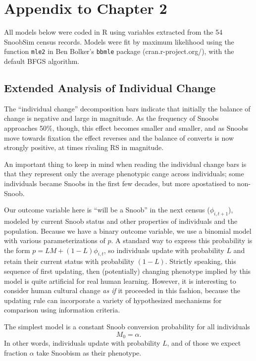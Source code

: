 \section{Appendix to Chapter 2}

All models below were coded in R using variables extracted from the 54 SnoobSim census records.  Models were fit by maximum likelihood using the function \texttt{mle2} in Ben Bolker's \texttt{bbmle} package (cran.r-project.org/), with the default BFGS algorithm.

\subsection{Extended Analysis of Individual Change}

The ``individual change'' decomposition bars indicate that initially the balance of change is negative and large in magnitude.  As the frequency of Snoobs approaches 50\%, though, this effect becomes smaller and smaller, and as Snoobs move towards fixation the effect reverses and the balance of converts is now strongly positive, at times rivaling RS in magnitude.

An important thing to keep in mind when reading the individual change bars is that they represent only the average phenotypic cange across individuals; some individuals became Snoobs in the first few decades, but more apostatised to non-Snoob.  

Our outcome variable here is ``will be a Snoob'' in the next census ($\phi_{i,t+1}$), modeled by current Snoob status and other properties of individuals and the population.  Because we have a binary outcome variable, we use a binomial model with various parameterizations of $p$.  A standard way to express this probability is the form $p = LM + (1-L)\phi_{i,t}$, so individuals update with probability $L$ and retain their current status with probability $(1-L)$.  Strictly speaking, this sequence of first updating, then (potentially) changing phenotype implied by this model is quite artificial for real human learning.  However, it is interesting to consider human cultural change \textit{as if} it proceeded in this fashion, because the updating rule can incorporate a variety of hypothesized mechanisms for comparison using information criteria. 

The simplest model is a constant Snoob conversion probability for all individuals
	\[M_0 = \alpha.
\]
In other words, individuals update with probability $L$, and of those we expect fraction $\alpha$ take Snoobism as their phenotype.


